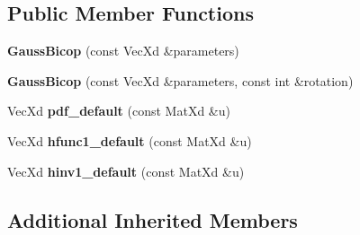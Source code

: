 \subsection*{Public Member Functions}
\begin{DoxyCompactItemize}
\item 
\hypertarget{class_gauss_bicop_a7701b11601e7d9cb0c49aa449440924e}{{\bfseries Gauss\+Bicop} (const Vec\+Xd \&parameters)}\label{class_gauss_bicop_a7701b11601e7d9cb0c49aa449440924e}

\item 
\hypertarget{class_gauss_bicop_aa3ca70729cc7f4b027dc660cf47bf908}{{\bfseries Gauss\+Bicop} (const Vec\+Xd \&parameters, const int \&rotation)}\label{class_gauss_bicop_aa3ca70729cc7f4b027dc660cf47bf908}

\item 
\hypertarget{class_gauss_bicop_ae12c6e56243c6f2d2878fa403f2ccb91}{Vec\+Xd {\bfseries pdf\+\_\+default} (const Mat\+Xd \&u)}\label{class_gauss_bicop_ae12c6e56243c6f2d2878fa403f2ccb91}

\item 
\hypertarget{class_gauss_bicop_a9a6e04b749c34920cc8c981dd8114c2b}{Vec\+Xd {\bfseries hfunc1\+\_\+default} (const Mat\+Xd \&u)}\label{class_gauss_bicop_a9a6e04b749c34920cc8c981dd8114c2b}

\item 
\hypertarget{class_gauss_bicop_a298263b90ef2ab40190d4fe00bd9196c}{Vec\+Xd {\bfseries hinv1\+\_\+default} (const Mat\+Xd \&u)}\label{class_gauss_bicop_a298263b90ef2ab40190d4fe00bd9196c}

\end{DoxyCompactItemize}
\subsection*{Additional Inherited Members}
